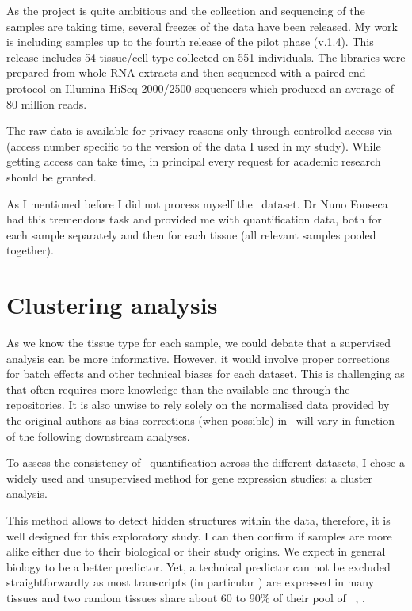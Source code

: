 As the project is quite ambitious and the collection and sequencing of the samples
are taking time, several freezes of the data have been released. My work is
including samples up to the fourth release of the pilot phase (v.1.4). This
release includes 54 tissue/cell type collected on 551 individuals.
The libraries were prepared from whole \gls{RNA} extracts and then sequenced
with a paired-end protocol on Illumina HiSeq 2000/2500 sequencers which produced
an average of 80 million reads.

The raw data is available for privacy reasons only through controlled access via
 (access number specific to the version of the data I used
in my study). While getting access can take time, in principal every request for
academic research should be granted.

As I mentioned before I did not process myself the \Gtex\ dataset.
Dr Nuno Fonseca had this tremendous task and provided me with quantification data,
both for each sample separately and then for each tissue (all relevant samples
pooled together).


\section{Clustering analysis}

As we know the tissue type for each sample, we could debate that a supervised
analysis can be more informative. However, it would involve proper corrections
for batch effects and other technical biases for each dataset.
This is challenging as that often requires more knowledge than the available one
through the repositories. It is also unwise to rely solely on the normalised data
provided by the original authors as bias corrections (when possible)
in \Rnaseq\ will vary in function of the following downstream analyses.

To assess the consistency of \Rnaseq\ quantification across the different
datasets, I chose a widely used and unsupervised method for gene
expression studies: a cluster analysis.

This method allows to detect hidden structures within the data, therefore,
it is well designed for this exploratory study.
I can then confirm if samples are more alike either due to their
biological or their study origins. We expect in general biology to be a better
predictor. Yet, a technical predictor can not be excluded straightforwardly
as most transcripts (in particular \mRNAs) are expressed in many tissues
and two random tissues share about 60 to 90\%  of their pool of \mRNAs\
\citep{ramskoldan:2009}, \citep{UhlenGastro}.


